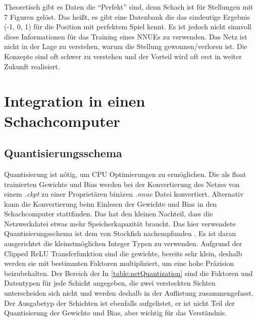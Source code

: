 Theoretisch gibt es Daten die \enquote{Perfekt} sind, denn Schach ist für Stellungen mit 7 Figuren gelöst. Das heißt, es gibt eine Datenbank die das eindeutige Ergebnis (-1, 0, 1) für die Position mit perfektem Spiel kennt. Es ist jedoch nicht sinnvoll diese Informationen für das Training eines \acp{NNUE} zu verwenden. Das Netz ist nicht in der Lage zu verstehen, warum die Stellung gewonnen/verloren ist. Die Konzepte sind oft schwer zu verstehen und der Vorteil wird oft erst in weiter Zukunft realisiert.

\section{Integration in einen Schachcomputer}

\subsection{Quantisierungsschema}

Quantisierung ist nötig, um CPU Optimierungen zu ermöglichen. Die als float trainierten Gewichte und Bias werden bei der Konvertierung des Netzes von einem \emph{.ckpt} zu einer Proprietären binären \emph{.nnue} Datei konvertiert. Alternativ kann die Konvertierung beim Einlesen der Gewichte und Bias in den Schachcomputer stattfinden. Das hat den kleinen Nachteil, dass die Netzwerkdatei etwas mehr Speicherkapazität braucht. Das hier verwendete Quantisierungsschema ist dem von Stockfish nachempfunden \cite{StockfishNNUE}. Es ist daran ausgerichtet die kleinstmöglichen Integer Typen zu verwenden. Aufgrund der Clipped \ac{ReLU} Transferfunktion sind die gewichte, bereits sehr klein, deshalb werden sie mit bestimmten Faktoren multipliziert, um eine hohe Präzision beizubehalten. Der Bereich der  In \autoref{table:netQuantization} sind die Faktoren und Datentypen für jede Schicht angegeben, die zwei versteckten Sichten unterscheiden sich nicht und werden deshalb in der Auflistung zusammengefasst. Der Ausgabetyp der Schichten ist ebenfalls aufgelistet, er ist nicht Teil der Quantisierung der Gewichte und Bias, aber wichtig für das Verständnis.

